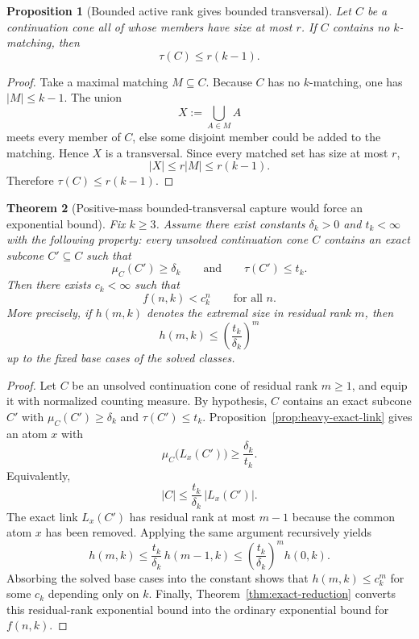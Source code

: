 \documentclass[11pt]{article}
\newtheorem{theorem}{Theorem}[section]
\newtheorem{proposition}[theorem]{Proposition}
\theoremstyle{definition}
\newcommand{\1}{\mathbf{1}}
\begin{document}
\begin{proposition}[Bounded active rank gives bounded transversal]\label{prop:bounded-rank-transversal}
Let $C$ be a continuation cone all of whose members have size at most $r$.
If $C$ contains no $k$-matching, then
\[
\tau(C)\le r(k-1).
\]
\end{proposition}

\begin{proof}
Take a maximal matching $M\subseteq C$.
Because $C$ has no $k$-matching, one has $|M|\le k-1$.
The union
\[
X:=\bigcup_{A\in M} A
\]
meets every member of $C$, else some disjoint member could be added to the matching.
Hence $X$ is a transversal.
Since every matched set has size at most $r$,
\[
|X|\le r|M|\le r(k-1).
\]
Therefore $\tau(C)\le r(k-1)$.
\end{proof}

\begin{theorem}[Positive-mass bounded-transversal capture would force an exponential bound]\label{thm:bounded-transversal-capture}
Fix $k\ge 3$.
Assume there exist constants $\delta_k>0$ and $t_k<\infty$ with the following property:
every unsolved continuation cone $C$ contains an exact subcone $C'\subseteq C$ such that
\[
\mu_C(C')\ge \delta_k
\qquad\text{and}\qquad
\tau(C')\le t_k.
\]
Then there exists $c_k<\infty$ such that
\[
f(n,k)<c_k^n
\qquad\text{for all }n.
\]
More precisely, if $h(m,k)$ denotes the extremal size in residual rank $m$, then
\[
h(m,k)\le \left(\frac{t_k}{\delta_k}\right)^m
\]
up to the fixed base cases of the solved classes.
\end{theorem}

\begin{proof}
Let $C$ be an unsolved continuation cone of residual rank $m\ge 1$, and equip it with normalized counting measure.
By hypothesis, $C$ contains an exact subcone $C'$ with $\mu_C(C')\ge \delta_k$ and $\tau(C')\le t_k$.
Proposition~\ref{prop:heavy-exact-link} gives an atom $x$ with
\[
\mu_C\bigl(L_x(C')\bigr)\ge \frac{\delta_k}{t_k}.
\]
Equivalently,
\[
|C|\le \frac{t_k}{\delta_k}\,|L_x(C')|.
\]
The exact link $L_x(C')$ has residual rank at most $m-1$ because the common atom $x$ has been removed.
Applying the same argument recursively yields
\[
h(m,k)\le \frac{t_k}{\delta_k}\,h(m-1,k)
\le
\left(\frac{t_k}{\delta_k}\right)^m h(0,k).
\]
Absorbing the solved base cases into the constant shows that $h(m,k)\le c_k^m$ for some $c_k$ depending only on $k$.
Finally, Theorem~\ref{thm:exact-reduction} converts this residual-rank exponential bound into the ordinary exponential bound for $f(n,k)$.
\end{proof}
\end{document}
